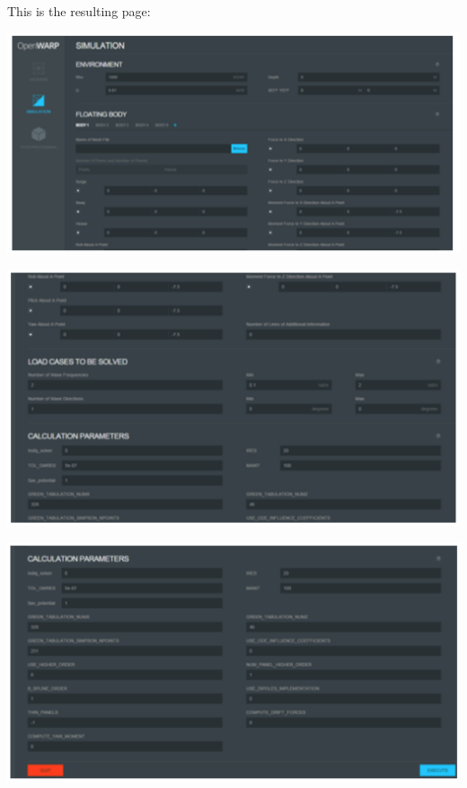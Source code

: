\documentclass[12pt]{article}
\begin{document}
This is the resulting page:

\vspace{\abovedisplayskip}
\begin{minipage}{\linewidth}
	\centering
	\includegraphics[scale=0.4]{img/26}
\end{minipage}
\vspace{\belowdisplayskip}

\vspace{\abovedisplayskip}
\begin{minipage}{\linewidth}
	\centering
	\includegraphics[scale=0.4]{img/27}
\end{minipage}
\vspace{\belowdisplayskip}

\vspace{\abovedisplayskip}
\begin{minipage}{\linewidth}
	\centering
	\includegraphics[scale=0.4]{img/28}
\end{minipage}
\vspace{\belowdisplayskip}
\end{document}
